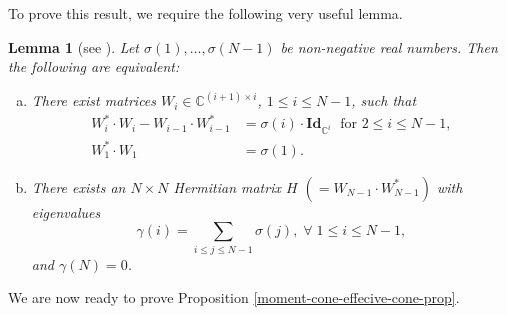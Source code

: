 \documentclass[11pt]{article}
\newtheorem{lemma}[theo]{Lemma}
\theoremstyle{definition}
\numberwithin{equation}{section}
\newcommand{\CC}{\mathbb C}
\newcommand{\Id}{\mathbf{Id}}
\begin{document}
To prove this result, we require the following very useful lemma.

\begin{lemma}[see {\cite[Sec. 3.4]{CB}}]
\label{lemma:moment-matrices}
Let $\sigma(1), \ldots, \sigma(N-1)$ be non-negative real numbers. Then the following are equivalent:
			\begin{enumerate}[(a)]
				\item There exist matrices $W_i \in \CC^{(i+1)\times i}$, $1 \leq i \leq N-1$, such that 
				\begin{align*}
				W_i^* \cdot W_i - W_{i-1} \cdot W_{i-1}^* &= \sigma(i) \cdot \Id_{\CC^i} \; \text{ for } 2 \leq i \leq N-1,\\
				W_1^* \cdot W_1 &=\sigma(1).
				\end{align*}
				\item There exists an $N \times N$ Hermitian matrix $H$ $\left(= W_{N-1} \cdot W_{N-1}^* \right)$ with eigenvalues 
				\[
				\gamma(i) = \sum_{i \leq j \leq N-1} \sigma(j), \; \forall \; 1 \leq i \leq N-1,
				\]
				and $\gamma(N) = 0$.
			\end{enumerate}
\end{lemma}

We are now ready to prove Proposition \ref{moment-cone-effecive-cone-prop}.
 
\end{document}
